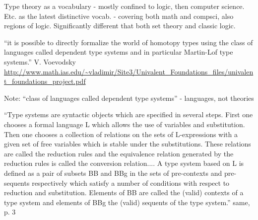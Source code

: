 {\todo Type theory as a vocabulary - mostly confined to logic, then
  computer science.  Etc.  \HoTT{} as the latest distinctive vocab. -
  covering both math and compsci, also regions of logic.
  Significantly different that both set theory and classic logic.}

``it is possible to directly formalize the world of homotopy types
using the class of languages called dependent type systems and in
particular Martin-Lof type systems.'' V. Voevodsky
\url{http://www.math.ias.edu/~vladimir/Site3/Univalent\_Foundations\_files/univalent\_foundations\_project.pdf}

Note: ``class of languages called dependent type systems'' -
languages, not theories

``Type systems are syntactic objects which are specified in several
steps. First one chooses a formal language L which allows the use of
variables and substitution. Then one chooses a collection of relations
on the sets of L-expressions with a given set of free variables which
is stable under the substitutions. These relations are called the
reduction rules and the equivalence relation generated by the
reduction rules is called the conversion relation....  A type system
based on L is defined as a pair of subsets BB and BBg in the sets of
pre-contexts and pre-sequents respectively which satisfy a number of
conditions with respect to reduction and substitution. Elements of BB
are called the (valid) contexts of a type system and elements of BBg
the (valid) sequents of the type system.'' same, p. 3



